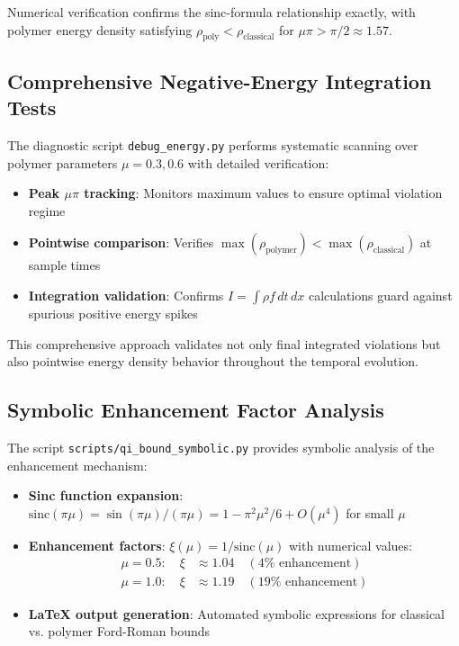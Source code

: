 \documentclass[12pt]{article}
\begin{document}
Numerical verification confirms the sinc-formula relationship exactly, with polymer energy density satisfying $\rho_{\text{poly}} < \rho_{\text{classical}}$ for $\mu\pi > \pi/2 \approx 1.57$.

\subsection{Comprehensive Negative-Energy Integration Tests}

The diagnostic script \texttt{debug\_energy.py} performs systematic scanning over polymer parameters $\mu = 0.3, 0.6$ with detailed verification:
\begin{itemize}
\item \textbf{Peak $\mu\pi$ tracking}: Monitors maximum values to ensure optimal violation regime
\item \textbf{Pointwise comparison}: Verifies $\max(\rho_{\text{polymer}}) < \max(\rho_{\text{classical}})$ at sample times
\item \textbf{Integration validation}: Confirms $I = \int\rho f \, dt \, dx$ calculations guard against spurious positive energy spikes
\end{itemize}

This comprehensive approach validates not only final integrated violations but also pointwise energy density behavior throughout the temporal evolution.

\subsection{Symbolic Enhancement Factor Analysis}

The script \texttt{scripts/qi\_bound\_symbolic.py} provides symbolic analysis of the enhancement mechanism:
\begin{itemize}
\item \textbf{Sinc function expansion}: $\text{sinc}(\pi\mu) = \sin(\pi\mu)/(\pi\mu) = 1 - \pi^2\mu^2/6 + O(\mu^4)$ for small $\mu$
\item \textbf{Enhancement factors}: $\xi(\mu) = 1/\text{sinc}(\mu)$ with numerical values:
  \begin{align}
  \mu = 0.5: \quad \xi &\approx 1.04 \quad (4\% \text{ enhancement}) \\
  \mu = 1.0: \quad \xi &\approx 1.19 \quad (19\% \text{ enhancement})
  \end{align}
\item \textbf{LaTeX output generation}: Automated symbolic expressions for classical vs. polymer Ford-Roman bounds
\end{itemize}
\end{document}
